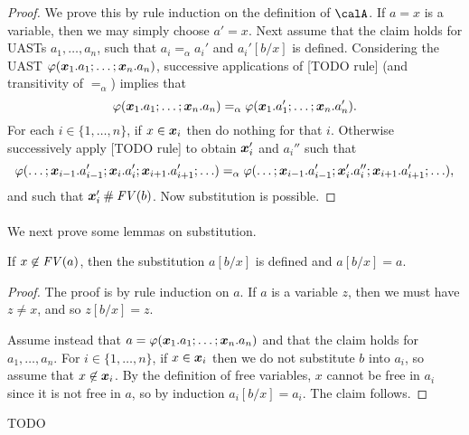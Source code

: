 \documentclass[a4paper, 11pt, article, danish, oneside]{memoir}
\DeclarePairedDelimiter{\auxdelimparen}{(}{)}
\renewcommand{\phi}{\varphi}
\newcommand{\newpar}{\paragraph{}}
\newcommand{\freevar}[2][]{\mathit{FV}\auxdelimparen[#1]{#2}}
\begin{document}
\begin{proof}
    We prove this by rule induction on the definition of $\calA$. If $a = x$ is a variable, then we may simply choose $a' = x$. Next assume that the claim holds for UASTs $a_1, \ldots, a_n$, such that $a_i =_\alpha a_i'$ and $a_i'[b/x]$ is defined. Considering the UAST $\phi(\seq{x}_1.a_1 ; \ldots ; \seq{x}_n.a_n)$, successive applications of [TODO rule] (and transitivity of $=_\alpha$) implies that
    \begin{equation*}
        \phi(\seq{x}_1.a_1 ; \ldots ; \seq{x}_n.a_n)
            =_\alpha \phi(\seq{x}_1.a_1' ; \ldots ; \seq{x}_n.a_n').
    \end{equation*}
    For each $i \in \{1, \ldots, n\}$, if $x \in \bm{x}_i$ then do nothing for that $i$. Otherwise successively apply [TODO rule] to obtain $\bm{x}_i'$ and $a_i''$ such that
    \begin{equation*}
        \phi( \ldots ; \seq{x}_{i-1}.a_{i-1}' ; \seq{x}_i.a_i' ; \seq{x}_{i+1}.a_{i+1}' ; \ldots )
            =_\alpha \phi( \ldots ; \seq{x}_{i-1}.a_{i-1}' ; \seq{x}_i'.a_i'' ; \seq{x}_{i+1}.a_{i+1}' ; \ldots ),
    \end{equation*}
    and such that $\seq{x}_i' \disj \freevar{b}$. Now substitution is possible.
\end{proof}


\newpar

We next prove some lemmas on substitution.

\begin{lemma}
    \label{lem:substitution-not-free}
    If $x \not\in \freevar{a}$, then the substitution $a[b/x]$ is defined and $a[b/x] = a$.
\end{lemma}

\begin{proof}
    The proof is by rule induction on $a$. If $a$ is a variable $z$, then we must have $z \neq x$, and so $z[b/x] = z$.

    Assume instead that $a = \phi(\seq{x}_1.a_1 ; \ldots ; \seq{x}_n.a_n)$ and that the claim holds for $a_1, \ldots, a_n$. For $i \in \{1, \ldots, n\}$, if $x \in \bm{x}_i$ then we do not substitute $b$ into $a_i$, so assume that $x \not\in \bm{x}_i$. By the definition of free variables, $x$ cannot be free in $a_i$ since it is not free in $a$, so by induction $a_i[b/x] = a_i$. The claim follows.
\end{proof}


\begin{lemma}
    \label{lem:substitution-lemma}
    TODO
\end{lemma}
\end{document}
